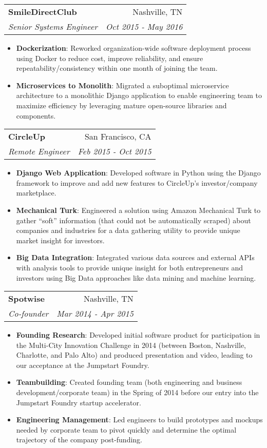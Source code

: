 \documentclass[letterpaper,10pt]{article}
\makeatletter
\newcommand{\resumeItem}[2]{
  \item\small{
    \textbf{#1}{: #2 \vspace{-2pt}}
  }
}
\newcommand{\resumeSubheading}[4]{
  \vspace{-1pt}\item
    \begin{tabular*}{0.97\textwidth}{l@{\extracolsep{\fill}}r}
      \textbf{#1} & #2 \\
      \textit{\small#3} & \textit{\small #4} \\
    \end{tabular*}\vspace{-5pt}
}
\newcommand{\resumeItemListStart}{\begin{itemize}}
\newcommand{\resumeItemListEnd}{\end{itemize}\vspace{-5pt}}
\makeatother
\begin{document}
    \resumeSubheading
      {SmileDirectClub}{Nashville, TN}
      {Senior Systems Engineer}{Oct 2015 - May 2016}
      \resumeItemListStart
        \resumeItem{Dockerization}
          {Reworked organization-wide software deployment process using Docker to reduce cost, improve reliability, and ensure repeatability/consistency within one month of joining the team.}
        \resumeItem{Microservices to Monolith}
          {Migrated a suboptimal microservice architecture to a monolithic Django application to enable engineering team to maximize efficiency by leveraging mature open-source libraries and components.}
      \resumeItemListEnd
      
    \resumeSubheading
      {CircleUp}{San Francisco, CA}
      {Remote Engineer}{Feb 2015 - Oct 2015}
      \resumeItemListStart
        \resumeItem{Django Web Application}
          {Developed software in Python using the Django framework to improve and add new features to CircleUp’s investor/company marketplace.}
        \resumeItem{Mechanical Turk}
          {Engineered a solution using Amazon Mechanical Turk to gather “soft” information (that could not be automatically scraped) about companies and industries for a data gathering utility to provide unique market insight for investors.}
        \resumeItem{Big Data Integration}
          {Integrated various data sources and external APIs with analysis tools to provide unique insight for both entrepreneurs and investors using Big Data approaches like data mining and machine learning.}
      \resumeItemListEnd

    \resumeSubheading
      {Spotwise}{Nashville, TN}
      {Co-founder}{Mar 2014 - Apr 2015}
      \resumeItemListStart
        \resumeItem{Founding Research}
          {Developed initial software product for participation in the Multi-City Innovation Challenge in 2014 (between Boston, Nashville, Charlotte, and Palo Alto) and produced presentation and video, leading to our acceptance at the Jumpstart Foundry.}
        \resumeItem{Teambuilding}
          {Created founding team (both engineering and business development/corporate team) in the Spring of 2014 before our entry into the Jumpstart Foundry startup accelerator.}
        \resumeItem{Engineering Management}
          {Led engineers to build prototypes and mockups needed by corporate team to pivot quickly and determine the optimal trajectory of the company post-funding.}
      \resumeItemListEnd
\end{document}
